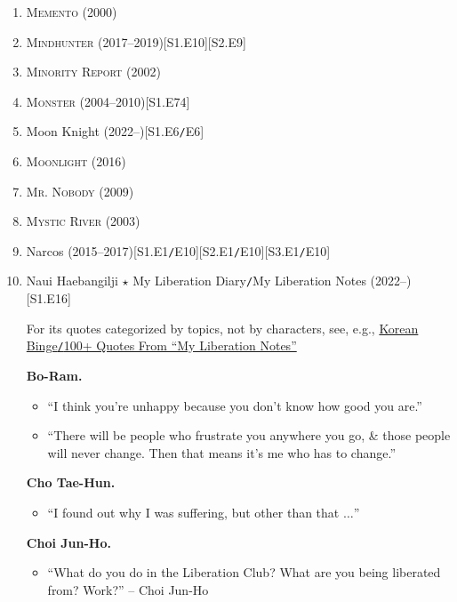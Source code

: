 \documentclass{article}
\begin{document}
\begin{enumerate}
	\item \textsc{Memento} (2000)
	\item \textsc{Mindhunter} (2017--2019)\hfill[S1.E10][S2.E9]
	\item \textsc{Minority Report} (2002)
	\item \textsc{Monster} (2004--2010)\hfill[S1.E74]
	\item Moon Knight (2022--)\hfill[S1.E6\texttt{/}E6]
	\item \textsc{Moonlight} (2016)
	\item \textsc{Mr. Nobody} (2009)
	\item \textsc{Mystic River} (2003)
	\item Narcos (2015--2017)\hfill[S1.E1\texttt{/}E10][S2.E1\texttt{/}E10][S3.E1\texttt{/}E10]
	\item Naui Haebangilji $\star$ My Liberation Diary\texttt{/}My Liberation Notes (2022--)\hfill[S1.E16]
	
	For its quotes categorized by topics, not by characters, see, e.g., \href{https://korean-binge.com/2022/04/12/100-quotes-from-my-liberation-notes/}{Korean Binge\texttt{/}100+ Quotes From ``My Liberation Notes''}	
	
	\textbf{Bo-Ram.}
	\begin{itemize}
		\item ``I think you're unhappy because you don't know how good you are.''
		\item ``There will be people who frustrate you anywhere you go, \& those people will never change. Then that means it's me who has to change.''
	\end{itemize}
	\textbf{Cho Tae-Hun.}
	\begin{itemize}
		\item ``I found out why I was suffering, but other than that $\ldots$''
	\end{itemize}
	\textbf{Choi Jun-Ho.}
	\begin{itemize}
		\item ``What do you do in the Liberation Club? What are you being liberated from? Work?'' -- Choi Jun-Ho
		

\end{itemize}
\end{enumerate}
\end{document}
